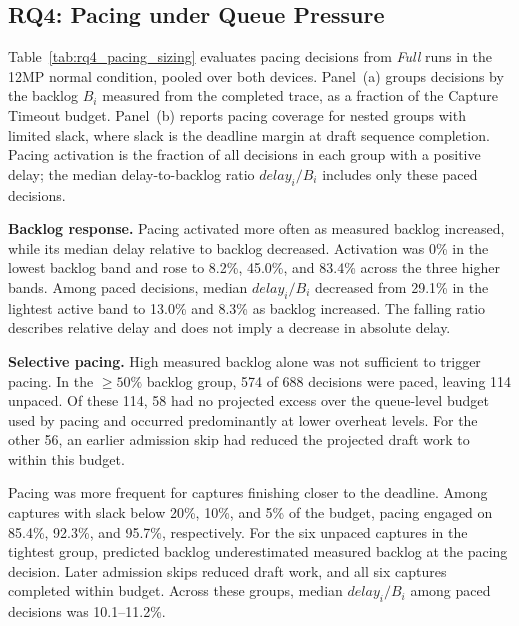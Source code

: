 \subsection{RQ4: Pacing under Queue Pressure}
\label{sec:rq4}

Table~\ref{tab:rq4_pacing_sizing} evaluates pacing decisions from \emph{Full} runs in the 12MP normal condition, pooled over both devices.
Panel~(a) groups decisions by the backlog \(B_i\) measured from the completed trace, as a fraction of the Capture Timeout budget.
Panel~(b) reports pacing coverage for nested groups with limited slack, where slack is the deadline margin at draft sequence completion.
Pacing activation is the fraction of all decisions in each group with a positive delay; the median delay-to-backlog ratio \(\mathit{delay}_i/B_i\) includes only these paced decisions.



\smallskip\noindent\textbf{Backlog response.}
Pacing activated more often as measured backlog increased, while its median delay relative to backlog decreased.
Activation was 0\% in the lowest backlog band and rose to 8.2\%, 45.0\%, and 83.4\% across the three higher bands.
Among paced decisions, median \(\mathit{delay}_i/B_i\) decreased from 29.1\% in the lightest active band to 13.0\% and 8.3\% as backlog increased.
The falling ratio describes relative delay and does not imply a decrease in absolute delay.

\smallskip\noindent\textbf{Selective pacing.}
High measured backlog alone was not sufficient to trigger pacing.
In the \(\geq 50\%\) backlog group, 574 of 688 decisions were paced, leaving 114 unpaced.
Of these 114, 58 had no projected excess over the queue-level budget used by pacing and occurred predominantly at lower overheat levels.
For the other 56, an earlier admission skip had reduced the projected draft work to within this budget.

Pacing was more frequent for captures finishing closer to the deadline.
Among captures with slack below 20\%, 10\%, and 5\% of the budget, pacing engaged on 85.4\%, 92.3\%, and 95.7\%, respectively.
For the six unpaced captures in the tightest group, predicted backlog underestimated measured backlog at the pacing decision.
Later admission skips reduced draft work, and all six captures completed within budget.
Across these groups, median \(\mathit{delay}_i/B_i\) among paced decisions was 10.1--11.2\%.
